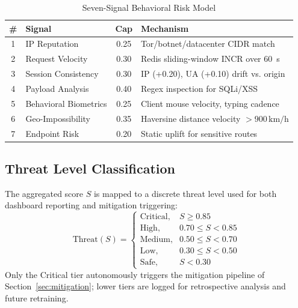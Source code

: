 \documentclass[conference]{IEEEtran}
\begin{document}
\begin{table}[!htbp]
\caption{Seven-Signal Behavioral Risk Model}
\label{tab:signals}
\centering
\scriptsize
\renewcommand{\arraystretch}{1.25}
\begin{tabularx}{\linewidth}{c >{\raggedright\arraybackslash}p{2.2cm} c >{\raggedright\arraybackslash}X}
\toprule
\textbf{\#} & \textbf{Signal} & \textbf{Cap} & \textbf{Mechanism} \\
\midrule
1 & IP Reputation & 0.25 & Tor/botnet/datacenter CIDR match \\
2 & Request Velocity & 0.30 & Redis sliding-window INCR over 60~s \\
3 & Session Consistency & 0.30 & IP (+0.20), UA (+0.10) drift vs. origin \\
4 & Payload Analysis & 0.40 & Regex inspection for SQLi/XSS \\
5 & Behavioral Biometrics & 0.25 & Client mouse velocity, typing cadence \\
6 & Geo-Impossibility & 0.35 & Haversine distance velocity $>900\,\text{km/h}$ \\
7 & Endpoint Risk & 0.20 & Static uplift for sensitive routes \\
\bottomrule
\end{tabularx}
\end{table}

\subsection{Threat Level Classification}
The aggregated score $S$ is mapped to a discrete threat level used for both dashboard reporting and mitigation triggering:
\begin{equation}
\text{Threat}(S) = 
\begin{cases} 
\text{Critical,} & S \ge 0.85 \\
\text{High,} & 0.70 \le S < 0.85 \\
\text{Medium,} & 0.50 \le S < 0.70 \\
\text{Low,} & 0.30 \le S < 0.50 \\
\text{Safe,} & S < 0.30 
\end{cases}
\label{eq:threat}
\end{equation}
Only the Critical tier autonomously triggers the mitigation pipeline of Section~\ref{sec:mitigation}; lower tiers are logged for retrospective analysis and future retraining.

\end{document}
